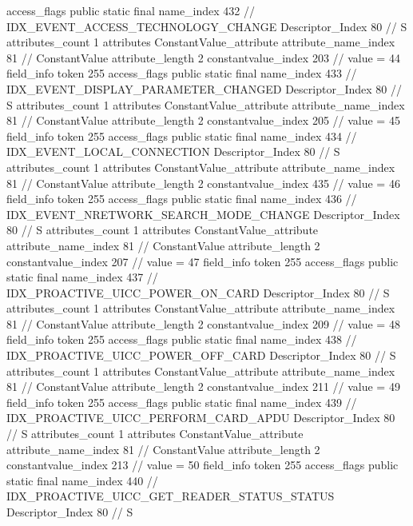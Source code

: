 {{{{{				access_flags	public static final
				name_index	432		// IDX_EVENT_ACCESS_TECHNOLOGY_CHANGE
				Descriptor_Index	80		// S
				attributes_count	1
				attributes {
				ConstantValue_attribute {
					attribute_name_index	81		// ConstantValue
					attribute_length	2
					constantvalue_index	203		// value = 44
				}
				}
			}
			field_info {
				token	255
				access_flags	public static final
				name_index	433		// IDX_EVENT_DISPLAY_PARAMETER_CHANGED
				Descriptor_Index	80		// S
				attributes_count	1
				attributes {
				ConstantValue_attribute {
					attribute_name_index	81		// ConstantValue
					attribute_length	2
					constantvalue_index	205		// value = 45
				}
				}
			}
			field_info {
				token	255
				access_flags	public static final
				name_index	434		// IDX_EVENT_LOCAL_CONNECTION
				Descriptor_Index	80		// S
				attributes_count	1
				attributes {
				ConstantValue_attribute {
					attribute_name_index	81		// ConstantValue
					attribute_length	2
					constantvalue_index	435		// value = 46
				}
				}
			}
			field_info {
				token	255
				access_flags	public static final
				name_index	436		// IDX_EVENT_NRETWORK_SEARCH_MODE_CHANGE
				Descriptor_Index	80		// S
				attributes_count	1
				attributes {
				ConstantValue_attribute {
					attribute_name_index	81		// ConstantValue
					attribute_length	2
					constantvalue_index	207		// value = 47
				}
				}
			}
			field_info {
				token	255
				access_flags	public static final
				name_index	437		// IDX_PROACTIVE_UICC_POWER_ON_CARD
				Descriptor_Index	80		// S
				attributes_count	1
				attributes {
				ConstantValue_attribute {
					attribute_name_index	81		// ConstantValue
					attribute_length	2
					constantvalue_index	209		// value = 48
				}
				}
			}
			field_info {
				token	255
				access_flags	public static final
				name_index	438		// IDX_PROACTIVE_UICC_POWER_OFF_CARD
				Descriptor_Index	80		// S
				attributes_count	1
				attributes {
				ConstantValue_attribute {
					attribute_name_index	81		// ConstantValue
					attribute_length	2
					constantvalue_index	211		// value = 49
				}
				}
			}
			field_info {
				token	255
				access_flags	public static final
				name_index	439		// IDX_PROACTIVE_UICC_PERFORM_CARD_APDU
				Descriptor_Index	80		// S
				attributes_count	1
				attributes {
				ConstantValue_attribute {
					attribute_name_index	81		// ConstantValue
					attribute_length	2
					constantvalue_index	213		// value = 50
				}
				}
			}
			field_info {
				token	255
				access_flags	public static final
				name_index	440		// IDX_PROACTIVE_UICC_GET_READER_STATUS_STATUS
				Descriptor_Index	80		// S
}}}}}
